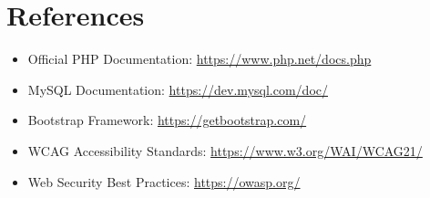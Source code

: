 \documentclass[12pt,a4paper]{report}
\begin{document}
\chapter{References}

\begin{itemize}
    \item Official PHP Documentation: \url{https://www.php.net/docs.php}
    \item MySQL Documentation: \url{https://dev.mysql.com/doc/}
    \item Bootstrap Framework: \url{https://getbootstrap.com/}
    \item WCAG Accessibility Standards: \url{https://www.w3.org/WAI/WCAG21/}
    \item Web Security Best Practices: \url{https://owasp.org/}
\end{itemize}
\end{document}
